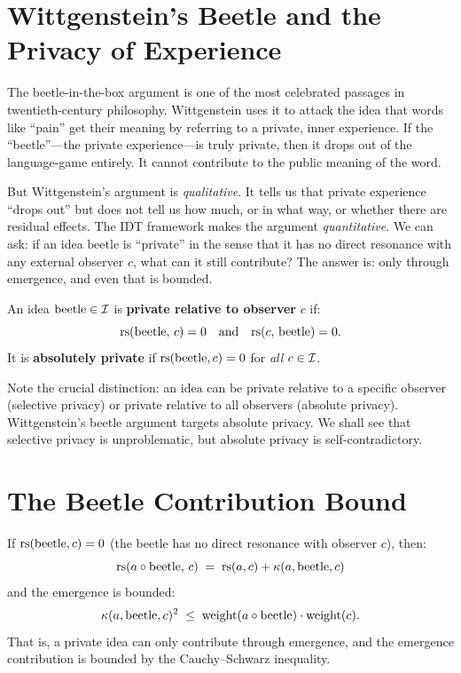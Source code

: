 \section{Wittgenstein's Beetle and the Privacy of Experience}

The beetle-in-the-box argument is one of the most celebrated passages in
twentieth-century philosophy.  Wittgenstein uses it to attack the idea that
words like ``pain'' get their meaning by referring to a private, inner
experience.  If the ``beetle''---the private experience---is truly private,
then it drops out of the language-game entirely.  It cannot contribute to
the public meaning of the word.

But Wittgenstein's argument is \emph{qualitative}.  It tells us that private
experience ``drops out'' but does not tell us how much, or in what way, or
whether there are residual effects.  The IDT framework makes the argument
\emph{quantitative}.  We can ask: if an idea $\mathrm{beetle}$ is ``private''
in the sense that it has no direct resonance with any external observer $c$,
what can it still contribute?  The answer is: only through emergence, and
even that is bounded.

\begin{definition}
\label{def:private-idea}
An idea $\mathrm{beetle} \in \mathcal{I}$ is \textbf{private relative to observer}
$c$ if:
\[
\mathrm{rs}(\mathrm{beetle},\, c) = 0 \quad\text{and}\quad
\mathrm{rs}(c,\, \mathrm{beetle}) = 0.
\]
It is \textbf{absolutely private} if $\mathrm{rs}(\mathrm{beetle}, c) = 0$ for
\emph{all} $c \in \mathcal{I}$.
\end{definition}

Note the crucial distinction: an idea can be private relative to a specific
observer (selective privacy) or private relative to all observers (absolute
privacy).  Wittgenstein's beetle argument targets absolute privacy.  We shall
see that selective privacy is unproblematic, but absolute privacy is
self-contradictory.

\section{The Beetle Contribution Bound}

\begin{theorem}
\label{thm:beetle-contribution}
If $\mathrm{rs}(\mathrm{beetle}, c) = 0$ (the beetle has no direct resonance with
observer $c$), then:
\[
\mathrm{rs}(a \circ \mathrm{beetle},\, c)
\;=\; \mathrm{rs}(a, c) + \kappa(a, \mathrm{beetle}, c)
\]
and the emergence is bounded:
\[
\kappa(a, \mathrm{beetle}, c)^2
\;\leq\;
\mathrm{weight}(a \circ \mathrm{beetle}) \cdot \mathrm{weight}(c).
\]
That is, a private idea can only contribute through emergence, and the
emergence contribution is bounded by the Cauchy--Schwarz inequality.
\end{theorem}

